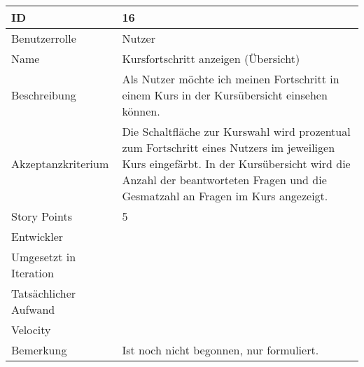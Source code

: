 \begin{tabularx}{\textwidth}{|p{}|X|}
	\hline
	ID & 16\\
	\hline
	Benutzerrolle & Nutzer\\
	\hline
	Name & Kursfortschritt anzeigen (Übersicht)\\
	\hline
	Beschreibung & Als Nutzer möchte ich meinen Fortschritt in einem Kurs in der Kursübersicht einsehen können.\\
	\hline
	Akzeptanzkriterium & Die Schaltfläche zur Kurswahl wird prozentual zum Fortschritt eines Nutzers im jeweiligen Kurs eingefärbt. In der Kursübersicht wird die Anzahl der beantworteten Fragen und die Gesmatzahl an Fragen im Kurs angezeigt.\\
	\hline
	Story Points & 5\\
	\hline
	Entwickler & \\
	\hline
	Umgesetzt in Iteration & \\ 
	\hline
	Tatsächlicher Aufwand & \\
	\hline
	Velocity & \\
	\hline
	Bemerkung & Ist noch nicht begonnen, nur formuliert.\\
	\hline
\end{tabularx}
\vspace{20pt}
